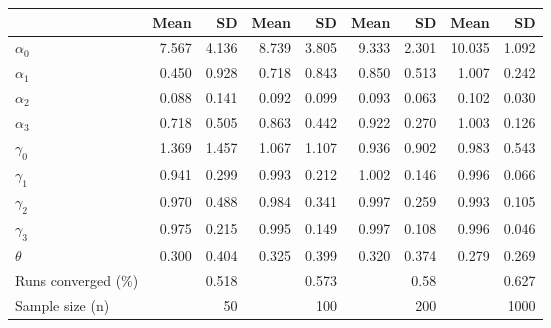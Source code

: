 
\begin{tabular}[t]{lrrrrrrrr}
\toprule
  & Mean & SD & Mean  & SD  & Mean   & SD   & Mean    & SD   \\
\midrule
$\alpha_{0}$ & 7.567 & 4.136 & 8.739 & 3.805 & 9.333 & 2.301 & 10.035 & 1.092\\
$\alpha_{1}$ & 0.450 & 0.928 & 0.718 & 0.843 & 0.850 & 0.513 & 1.007 & 0.242\\
$\alpha_{2}$ & 0.088 & 0.141 & 0.092 & 0.099 & 0.093 & 0.063 & 0.102 & 0.030\\
$\alpha_{3}$ & 0.718 & 0.505 & 0.863 & 0.442 & 0.922 & 0.270 & 1.003 & 0.126\\
$\gamma_{0}$ & 1.369 & 1.457 & 1.067 & 1.107 & 0.936 & 0.902 & 0.983 & 0.543\\
$\gamma_{1}$ & 0.941 & 0.299 & 0.993 & 0.212 & 1.002 & 0.146 & 0.996 & 0.066\\
$\gamma_{2}$ & 0.970 & 0.488 & 0.984 & 0.341 & 0.997 & 0.259 & 0.993 & 0.105\\
$\gamma_{3}$ & 0.975 & 0.215 & 0.995 & 0.149 & 0.997 & 0.108 & 0.996 & 0.046\\
$\theta$ & 0.300 & 0.404 & 0.325 & 0.399 & 0.320 & 0.374 & 0.279 & 0.269\\
Runs converged (\%) &  & 0.518 &  & 0.573 &  & 0.58 &  & 0.627\\
Sample size (n) &  & 50 &  & 100 &  & 200 &  & 1000\\
\bottomrule
\end{tabular}
